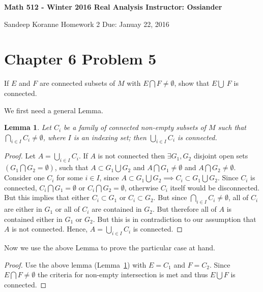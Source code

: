\documentclass{article}
\newtheorem{lem}{Lemma}
\newtheorem{proof}{Proof}
\begin{document}
\thispagestyle{empty}

\textbf{Math 512 - Winter 2016 \hfill Real Analysis  \hfill Instructor: Ossiander}

\hrulefill 
\medskip 

 {Sandeep Koranne \hfill Homework 2 \hfill Due: Januay 22, 2016}
\medskip


\section{Chapter 6 Problem 5}
If $E$ and $F$ are connected subsets of $M$ with $E\bigcap F\ne \emptyset$,
show that $E\bigcup\ F$ is connected.

We first need a general Lemma.
\begin{lem}
\label{lem1}
Let $C_i$ be a family of connected non-empty subsets of $M$ such that
$\bigcap_{i\in I} C_i\ne\emptyset$, where $I$ is an indexing set; then
$\bigcup_{i\in I} C_i$ is connected.
\end{lem}
\begin{proof}
Let $A=\bigcup_{i\in I} C_i$. If $A$ is not connected then $\exists G_1,G_2$ 
disjoint open sets $(G_1\bigcap G_2=\emptyset)$, 
such that $A\subset G_1 \bigcup G_2$ and $A\bigcap G_1\ne\emptyset$ and
$A\bigcap G_2\ne\emptyset$. Consider one $C_i$ for some $i\in I$, since
$A\subset G_1 \bigcup G_2\implies C_i\subset G_1\bigcup G_2$.
Since $C_i$ is connected, $C_i\bigcap G_1=\emptyset$ or $C_i\bigcap G_2=\emptyset$, otherwise
$C_i$ itself would be disconnected. But this implies that either $C_i\subset G_1$
or $C_i\subset G_2$. But since $\bigcap_{i\in I}C_i \ne\emptyset$, all of $C_i$
are either in $G_1$ or all of $C_i$ are contained in $G_2$. But therefore all of $A$
is contained either in $G_1$ or $G_2$. But this is in contradiction to our assumption
that $A$ is not connected. Hence, $A=\bigcup_{i\in I}C_i$ is connected.
\end{proof}
Now we use the above Lemma to prove the particular case at hand.
\begin{proof}
Use the above lemma (Lemma~\ref{lem1}) with $E=C_1$ and $F=C_2$. Since $E\bigcap F\ne\emptyset$
the criteria for non-empty intersection is met and thus $E\bigcup F$
is connected.
\end{proof}
\end{document}
